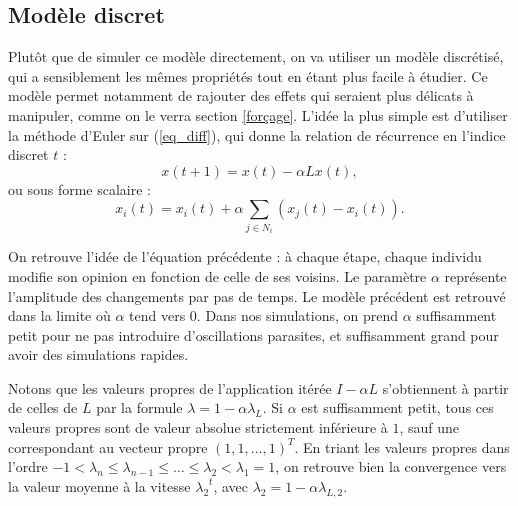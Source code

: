 \documentclass[12pt]{article}
\begin{document}
\subsection{Modèle discret}
\label{mod_discret}
Plutôt que de simuler ce modèle directement, on va utiliser un modèle
discrétisé, qui a sensiblement les mêmes propriétés tout en étant plus
facile à étudier. Ce modèle permet notamment de rajouter des effets
qui seraient plus délicats à manipuler, comme on le verra section
\ref{forçage}. L'idée la plus simple est d'utiliser la méthode d'Euler
sur (\ref{eq_diff}), qui donne la relation de récurrence en l'indice
discret $t$ :
\begin{equation}
 \label{eq_discrete}
 x(t+1) = x(t) - \alpha L x(t),
\end{equation}
ou sous forme scalaire :
\begin{equation}
 \label{eq_discrete_scal}
 x_i(t) = x_i(t) + \alpha \sum_{j \in N_i} (x_j(t) - x_i(t)).
\end{equation}

On retrouve l'idée de l'équation précédente : à chaque étape, chaque
individu modifie son opinion en fonction de celle de ses voisins. Le
paramètre $\alpha$ représente l'amplitude des changements par pas de
temps. Le modèle précédent est retrouvé dans la limite où $\alpha$
tend vers 0. Dans nos simulations, on prend $\alpha$ suffisamment
petit pour ne pas introduire d'oscillations parasites, et suffisamment
grand pour avoir des simulations rapides.

Notons que les valeurs propres de l'application itérée $I - \alpha L$
s'obtiennent à partir de celles de $L$ par la formule $\lambda = 1 -
\alpha \lambda_L$. Si $\alpha$ est suffisamment petit, tous ces
valeurs propres sont de valeur absolue strictement inférieure à $1$,
sauf une correspondant au vecteur propre $(1, 1, \dots, 1)^T$. En
triant les valeurs propres dans l'ordre $-1 < \lambda_n \leq
\lambda_{n-1} \leq \dots \leq \lambda_2 < \lambda_1 = 1$, on
retrouve bien la convergence vers la valeur moyenne à la vitesse
${\lambda_2}^t$, avec $\lambda_2 = 1 - \alpha \lambda_{L,2}$.
\end{document}

